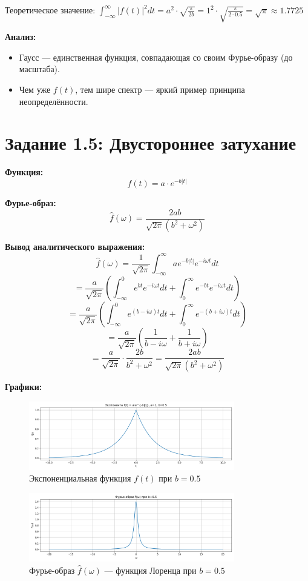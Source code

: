 Теоретическое значение: $\displaystyle \int_{-\infty}^{\infty} |f(t)|^2 dt = a^2 \cdot \sqrt{\frac{\pi}{2b}} = 1^2 \cdot \sqrt{\frac{\pi}{2 \cdot 0.5}} = \sqrt{\pi} \approx 1.7725$

\textbf{Анализ:}

\begin{itemize}
    \item Гаусс — единственная функция, совпадающая со своим Фурье-образу (до масштаба).
    \item Чем уже $f(t)$, тем шире спектр — яркий пример принципа неопределённости.
\end{itemize}

\section*{Задание 1.5: Двустороннее затухание}

\textbf{Функция:}
\[
f(t) = a \cdot e^{-b |t|}
\]

\textbf{Фурье-образ:}
\[
\hat{f}(\omega) = \frac{2ab}{\sqrt{2\pi}(b^2 + \omega^2)}
\]

\textbf{Вывод аналитического выражения:}
\[
\hat{f}(\omega) = \frac{1}{\sqrt{2\pi}} \int_{-\infty}^{\infty} a e^{-b |t|} e^{-i \omega t} dt
\]
\[
= \frac{a}{\sqrt{2\pi}} \left( \int_{-\infty}^{0} e^{b t} e^{-i \omega t} dt + \int_{0}^{\infty} e^{-b t} e^{-i \omega t} dt \right)
\]
\[
= \frac{a}{\sqrt{2\pi}} \left( \int_{-\infty}^{0} e^{(b - i \omega) t} dt + \int_{0}^{\infty} e^{-(b + i \omega) t} dt \right)
\]
\[
= \frac{a}{\sqrt{2\pi}} \left( \frac{1}{b - i \omega} + \frac{1}{b + i \omega} \right)
\]
\[
= \frac{a}{\sqrt{2\pi}} \cdot \frac{2b}{b^2 + \omega^2} = \frac{2ab}{\sqrt{2\pi}(b^2 + \omega^2)}
\]

\textbf{Графики:}

\begin{figure}[H]
    \centering
    \includegraphics[width=0.8\textwidth]{python/exp_function_b0.5.png}
    \caption{Экспоненциальная функция $f(t)$ при $b = 0.5$}
\end{figure}

\begin{figure}[H]
    \centering
    \includegraphics[width=0.8\textwidth]{python/exp_fourier_b0.5.png}
    \caption{Фурье-образ $\hat{f}(\omega)$ — функция Лоренца при $b = 0.5$}
\end{figure}


